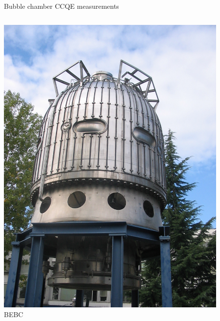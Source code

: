\begin{frame}{Bubble chamber CCQE measurements}

\begin{columns}
  \begin{column}{0.33\textwidth}
   \begin{center}
     \includegraphics[width=0.90\textwidth]{./images/bc/bebc.jpg}\\
     {\small BEBC}
    \end{center}
  \end{column}
  \begin{column}{0.33\textwidth}
   \begin{center}

\end{center}
\end{column}
\end{columns}
\end{frame}
